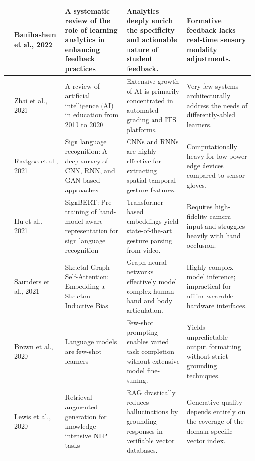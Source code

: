 \begin{longtable}{|p{1.2cm}|p{2.8cm}|p{4.2cm}|p{4.0cm}|p{3.8cm}|}
	\cite{banihashem2022} & Banihashem et al., 2022 & A systematic review of the role of learning analytics in enhancing feedback practices & Analytics deeply enrich the specificity and actionable nature of student feedback. & Formative feedback lacks real-time sensory modality adjustments. \\
	\hline
	
	\cite{search18_2025} & Zhai et al., 2021 & A review of artificial intelligence (AI) in education from 2010 to 2020 & Extensive growth of AI is primarily concentrated in automated grading and ITS platforms. & Very few systems architecturally address the needs of differently-abled learners. \\
	\hline
	
	\cite{rastgoo2021} & Rastgoo et al., 2021 & Sign language recognition: A deep survey of CNN, RNN, and GAN-based approaches & CNNs and RNNs are highly effective for extracting spatial-temporal gesture features. & Computationally heavy for low-power edge devices compared to sensor gloves. \\
	\hline
	
	\cite{zhou2024} & Hu et al., 2021 & SignBERT: Pre-training of hand-model-aware representation for sign language recognition & Transformer-based embeddings yield state-of-the-art gesture parsing from video. & Requires high-fidelity camera input and struggles heavily with hand occlusion. \\
	\hline
	
	\cite{batte2025} & Saunders et al., 2021 & Skeletal Graph Self-Attention: Embedding a Skeleton Inductive Bias & Graph neural networks effectively model complex human hand and body articulation. & Highly complex model inference; impractical for offline wearable hardware interfaces. \\
	\hline
	
	\cite{brown2020} & Brown et al., 2020 & Language models are few-shot learners & Few-shot prompting enables varied task completion without extensive model fine-tuning. & Yields unpredictable output formatting without strict grounding techniques. \\
	\hline
	
	\cite{lewis2020} & Lewis et al., 2020 & Retrieval-augmented generation for knowledge-intensive NLP tasks & RAG drastically reduces hallucinations by grounding responses in verifiable vector databases. & Generative quality depends entirely on the coverage of the domain-specific vector index. \\
	\hline
	

\end{longtable}
